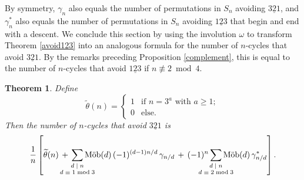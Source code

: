 \documentclass[12pt]{article}
\newcommand{\Perm}{S}
\DeclareMathOperator{\mob}{M\ddot{o}b}
\newcommand{\gam}{\gamma}
\newtheorem{thm}{Theorem}[section]
\theoremstyle{definition}
\begin{document}
By symmetry, $\gamma_n$ also equals the number of permutations in $\Perm_n$ avoiding $\underline{321}$, and $\gamma_n^*$ also equals the number of permutations in $\Perm_n$ avoiding $\underline{123}$ that begin and end with a descent. We conclude this section by using the involution $\omega$ to transform Theorem \ref{avoid123} into an analogous formula for the number of $n$-cycles that avoid $\underline{321}$. 
By the remarks preceding Proposition \ref{complement}, this is equal to the number of $n$-cycles that avoid $\underline{123}$ if $n \not\equiv 2\bmod4$.

\begin{thm} \label{avoid321} Define
\[ \widetilde{\theta}(n) = \begin{cases}
1 & \text{if $n = 3^a$ with $a \ge 1$}; \\
0 & \text{else}.
\end{cases} \]
Then the number of $n$-cycles that avoid $\underline{321}$ is
\[ \frac{1}{n} \left[ \widetilde{\theta}(n) \,+\, \sum_{\mathclap{\substack{\text{$d \mid n$}\\ \text{$d \equiv 1\bmod 3$}}}} \mob(d)\,(-1)^{(d-1)n/d}\, \gam_{n/d} \,+\, (-1)^n \sum_{\mathclap{\substack{\text{$d \mid n$}\\ \text{$d \equiv 2\bmod 3$}}}} \mob(d)\, \gam_{n/d}^*\right]. \]
\end{thm}
\end{document}
